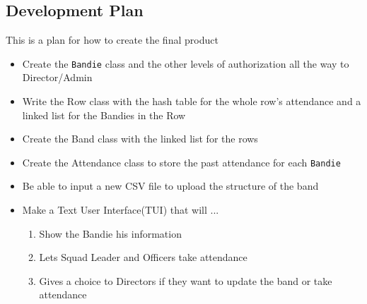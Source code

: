 \documentclass{article}
\begin{document}
\subsection{Development Plan}
This is a plan for how to create the final product
\begin{itemize}
	\item Create the \verb|Bandie| class and the other levels of authorization all the way to Director/Admin
	\item Write the Row class with the hash table for the whole row’s attendance and a linked list for the Bandies in the Row
	\item Create the Band class with the linked list for the rows
	\item Create the Attendance class to store the past  attendance for each \verb|Bandie|
	\item Be able to input a new CSV file to upload the structure of the band
	\item Make a Text User Interface(TUI) that will ...
		\begin{enumerate}
			\item Show the Bandie his information
			\item Lets Squad Leader and Officers take attendance
			\item Gives a choice to Directors if they want to update the band or take attendance
		\end{enumerate}
\end{itemize}
\end{document}
